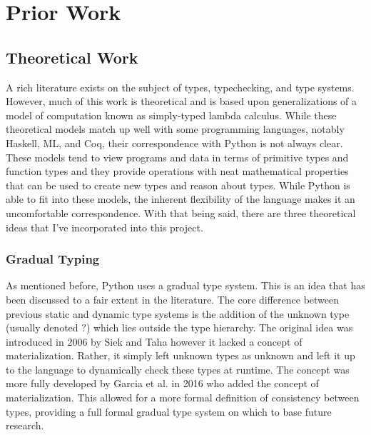 \documentclass[10pt,twocolumn]{article}
\begin{document}
\section{Prior Work}

\subsection{Theoretical Work}

A rich literature exists on the subject of types, typechecking, and type systems. However, much of this work is theoretical and is based upon generalizations of a model of computation known as simply-typed lambda calculus. While these theoretical models match up well with some programming languages, notably Haskell, ML, and Coq, their correspondence with Python is not always clear. These models tend to view programs and data in terms of primitive types and function types and they provide operations with neat mathematical properties that can be used to create new types and reason about types. While Python is able to fit into these models, the inherent flexibility of the language makes it an uncomfortable correspondence. With that being said, there are three theoretical ideas that I've incorporated into this project.

\subsubsection{Gradual Typing}
As mentioned before, Python uses a gradual type system. This is an idea that has been discussed to a fair extent in the literature. The core difference between previous static and dynamic type systems is the addition of the unknown type (usually denoted $?$) which lies outside the type hierarchy. The original idea was introduced in 2006 by Siek and Taha \cite{siek_gradual_nodate} however it lacked a concept of materialization. Rather, it simply left unknown types as unknown and left it up to the language to dynamically check these types at runtime. The concept was more fully developed by Garcia et al. in 2016 \cite{garcia2016abstracting} who added the concept of materialization. This allowed for a more formal definition of consistency between types, providing a full formal gradual type system on which to base future research.
\end{document}

